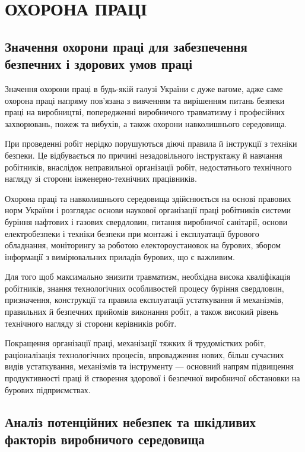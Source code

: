 \section{ОХОРОНА ПРАЦІ}
\subsection{Значення охорони праці для забезпечення безпечних і здорових умов праці}
\par Значення охорони праці в будь-якій галузі України є дуже вагоме, адже саме охорона праці напряму пов'язана з вивченням та вирішенням питань безпеки праці на виробництві, попередженні виробничого травматизму і професійних захворювань, пожеж та вибухів, а також охорони навколишнього середовища.
\par При проведенні робіт нерідко порушуються діючі правила й інструкції з техніки безпеки. Це відбувається по причині незадовільного інструктажу й навчання робітників,  внаслідок неправильної організації робіт, недостатнього технічного нагляду зі сторони інженерно-технічних працівників.
\par Охорона праці та навколишнього середовища здійснюється на основі правових норм України і розглядає основи наукової організації праці робітників системи буріння нафтових і газових свердловин, питання виробничої санітарії, основи електробезпеки і техніки безпеки при монтажі і експлуатації бурового обладнання, моніторингу за роботою електороустановок на бурових, збором інформації з вимірювальних приладів бурових, що є важливим. 
\par Для того щоб максимально знизити травматизм, необхідна висока кваліфікація робітників, знання технологічних особливостей процесу буріння свердловин, призначення, конструкції та правила експлуатації устаткування й механізмів, правильних й безпечних прийомів виконання робіт, а також високий рівень технічного нагляду зі сторони керівників робіт.
\par Покращення організації праці, механізації тяжких й трудомістких робіт, раціоналізація технологічних процесів, впровадження нових, більш сучасних видів устаткування, механізмів та інструменту — основний напрям  підвищення продуктивності праці й створення здорової і безпечної виробничої обстановки на бурових підприємствах.

\subsection{Аналіз потенційних небезпек та шкідливих факторів виробничого середовища}

